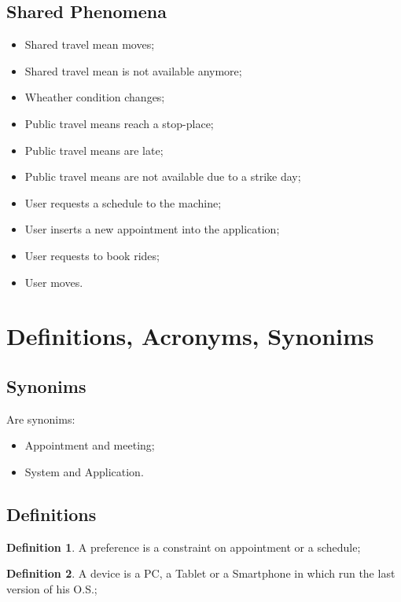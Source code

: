 \subsection{Shared Phenomena}
\begin{itemize}
\item Shared travel mean moves;
\item Shared travel mean is not available anymore;
\item Wheather condition changes;
\item Public travel means reach a stop-place;
\item Public travel means are late; 
\item Public travel means are not available due to a strike day;
\item User requests a schedule to the machine;
\item User inserts a new appointment into the application;
\item User requests to book rides;
\item User moves.
\end{itemize}

\section{Definitions, Acronyms, Synonims}

\subsection{Synonims}
Are synonims:
\begin{itemize}
\item Appointment and meeting;
\item System and Application.
\end{itemize}

\subsection{Definitions}
\theoremstyle{definition}
\newtheorem{definition}{Definition}[section]
 
\begin{definition} \label{def:preference}
A preference is a constraint on appointment or a schedule;
\end{definition}

\begin{definition} \label{def:device}
A device is a PC, a Tablet or a Smartphone in which run the last version of his O.S.;
\end{definition}

